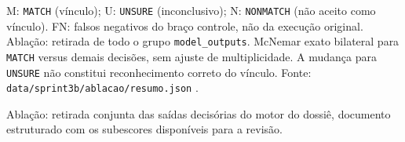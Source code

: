 \begin{table}[!ht]
\centering
\footnotesize
\caption{Ablação conjunta das saídas do motor no dossiê de revisão, em 18 pares verdadeiros selecionados por falso negativo compartilhado no modo vigilância.}
\label{tab:cap8-ablacao-dossie}
\par\smallskip
\parbox{\linewidth}{\footnotesize M: \texttt{MATCH} (vínculo); U: \texttt{UNSURE} (inconclusivo); N: \texttt{NONMATCH} (não aceito como vínculo). FN: falsos negativos do braço controle, não da execução original. Ablação: retirada de todo o grupo \texttt{model\_outputs}. McNemar exato bilateral para \texttt{MATCH} versus demais decisões, sem ajuste de multiplicidade. A mudança para \texttt{UNSURE} não constitui reconhecimento correto do vínculo. Fonte: \texttt{data/sprint3b/ablacao/resumo.json} \cite{Jardim2026phdrepo}.}
\par\footnotesize Ablação: retirada conjunta das saídas decisórias do motor do dossiê, documento estruturado com os subescores disponíveis para a revisão.
\end{table}

